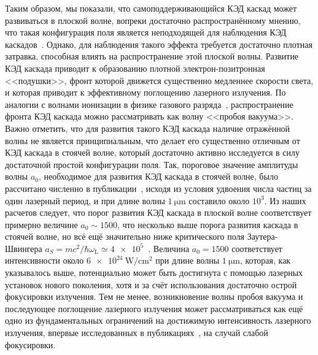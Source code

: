 Таким образом, мы показали, что самоподдерживающийся КЭД каскад может развиваться в плоской волне, вопреки достаточно распространённому мнению, что такая конфигурация поля является неподходящей для наблюдения КЭД каскадов~\cite{narozhny2015quantum,mironov2017observable,bulanov2013electromagnetic}.
Однако, для наблюдения такого эффекта требуется достаточно плотная затравка, способная влиять на распространение этой плоской волны.
Развитие КЭД каскада приводит к образованию плотной электрон-позитронная <<подушки>>, фронт которой движется существенно медленнее скорости света, и которая приводит к эффективному поглощению лазерного излучения.
По аналогии с волнами ионизации в физике газового разряда~\cite{bollen1983high,semenov1982breakdown}, распространение фронта КЭД каскада можно рассматривать как волну <<пробоя вакуума>>.
Важно отметить, что для развития такого КЭД каскада наличие отражённой волны не является принципиальным, что делает его существенно отличным от КЭД каскада в стоячей волне, который достаточно активно исследуется в силу достаточной простой конфигурации поля.
Так, пороговое значение амплитуды волны $a_0$, необходимое для развития КЭД каскада в стоячей волне, было рассчитано численно в публикации~\cite{grismayer2017seeded}, исходя из условия удвоения числа частиц за один лазерный период, и при длине волны $\SI{1}{\um}$ составило около $10^3$.
Из наших расчетов следует, что порог развития КЭД каскада в плоской волне соответствует примерно величине $a_0 \sim 1500$, что несколько выше порога развития каскада в стоячей волне, но всё ещё значительно ниже критического поля Заутера-Швингера $a_S = m c^2/ \hbar \omega_\mathrm{L} \simeq \num{4e5}$~\cite{Sauter31, Schwinger51}.
Величина $a_0 = 1500$ соответствует интенсивности около $\SI{6e24}{\watt/\centi\meter^2}$ при длине волны $\SI{1}{\um}$, которая, как указывалось выше, потенциально может быть достигнута с помощью лазерных установок нового поколения, хотя и за счёт использования достаточно острой фокусировки излучения.
Тем не менее, возникновение волны пробоя вакуума и последующее поглощение лазерного излучения может рассматриваться как ещё одно из фундаментальных ограничений на достижимую интенсивность лазерного излучения, впервые исследованных в публикациях~\cite{Bell2008, fedotov2010limitations}, на случай слабой фокусировки.

